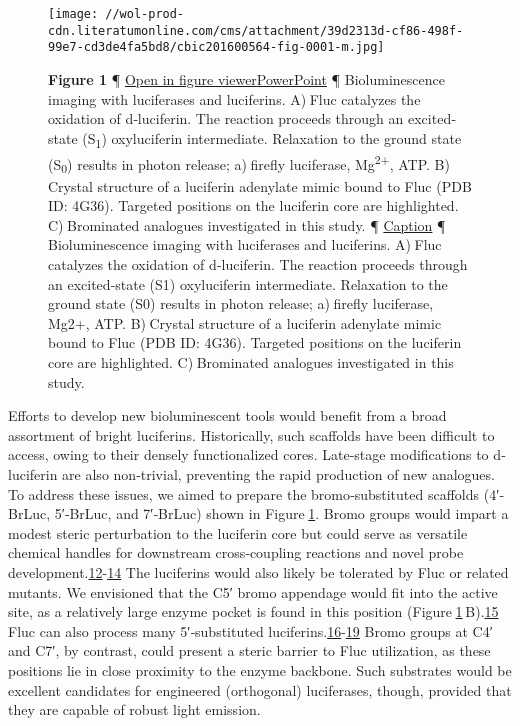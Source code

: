 \begin{figure}
\centering
\texttt{[image: //wol-prod-cdn.literatumonline.com/cms/attachment/39d2313d-cf86-498f-99e7-cd3de4fa5bd8/cbic201600564-fig-0001-m.jpg]}
\caption{\textbf{Figure 1} ¶ \protect\hyperlink{}{Open in figure
viewer}\href{/action/downloadFigures?id=cbic201600564-fig-0001\&doi=10.1002\%2Fcbic.201600564}{PowerPoint}
¶ Bioluminescence imaging with luciferases and luciferins. A) Fluc
catalyzes the oxidation of {d}‐luciferin. The reaction proceeds through
an excited‐state (S\textsubscript{1}) oxyluciferin intermediate.
Relaxation to the ground state (S\textsubscript{0}) results in photon
release; a) firefly luciferase, Mg\textsuperscript{2+}, ATP. B) Crystal
structure of a luciferin adenylate mimic bound to Fluc (PDB ID: 4G36).
Targeted positions on the luciferin core are highlighted. C) Brominated
analogues investigated in this study. ¶
\protect\hyperlink{}{{Caption}\emph{}} ¶ Bioluminescence imaging with
luciferases and luciferins. A) Fluc catalyzes the oxidation of
d‐luciferin. The reaction proceeds through an excited‐state (S1)
oxyluciferin intermediate. Relaxation to the ground state (S0) results
in photon release; a) firefly luciferase, Mg2+, ATP. B) Crystal
structure of a luciferin adenylate mimic bound to Fluc (PDB ID: 4G36).
Targeted positions on the luciferin core are highlighted. C) Brominated
analogues investigated in this study.}
\end{figure}

Efforts to develop new bioluminescent tools would benefit from a broad
assortment of bright luciferins. Historically, such scaffolds have been
difficult to access, owing to their densely functionalized cores.
Late‐stage modifications to {d}‐luciferin are also non‐trivial,
preventing the rapid production of new analogues. To address these
issues, we aimed to prepare the bromo‐substituted scaffolds (4′‐BrLuc,
5′‐BrLuc, and 7′‐BrLuc) shown in
Figure \protect\hyperlink{cbic201600564-fig-0001}{1}. Bromo groups would
impart a modest steric perturbation to the luciferin core but could
serve as versatile chemical handles for downstream cross‐coupling
reactions and novel probe
development.{\protect\hyperlink{cbic201600564-bib-0012}{12}-\protect\hyperlink{cbic201600564-bib-0014}{14}}
The luciferins would also likely be tolerated by Fluc or related
mutants. We envisioned that the C5′ bromo appendage would fit into the
active site, as a relatively large enzyme pocket is found in this
position
(Figure \protect\hyperlink{cbic201600564-fig-0001}{1} B).{\protect\hyperlink{cbic201600564-bib-0015}{15}}
Fluc can also process many 5′‐substituted
luciferins.{\protect\hyperlink{cbic201600564-bib-0016}{16}-\protect\hyperlink{cbic201600564-bib-0019}{19}}
Bromo groups at C4′ and C7′, by contrast, could present a steric barrier
to Fluc utilization, as these positions lie in close proximity to the
enzyme backbone. Such substrates would be excellent candidates for
engineered (orthogonal) luciferases, though, provided that they are
capable of robust light emission.


